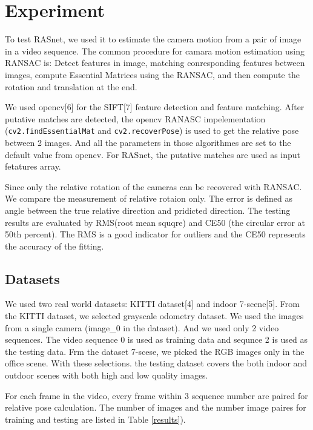 \documentclass{article}
\begin{document}
\section{Experiment}
To test RASnet, we used it to estimate the camera motion from a pair of image in a video sequence. The common procedure for camara motion estimation using RANSAC is: Detect features in image, matching conresponding features between images, compute Essential Matrices using the RANSAC, and then compute the rotation and translation at the end.

We used opencv[6] for the SIFT[7] feature detection and feature matching.  After putative matches are detected, the opencv RANASC impelementation  (\verb+cv2.findEssentialMat+ and \verb+cv2.recoverPose+) is used to get the relative pose between 2 images.
And all the parameters in those algorithmes are set to the default value from opencv. For RASnet, the putative matches are used as input fetatures array.

Since only the relative rotation of the cameras can be recovered with RANSAC. We compare the measurement of relative rotaion only. The error is defined as angle between the true relative direction and pridicted direction.
The testing results are evaluated by RMS(root mean squqre) and CE50 (the circular error at 50th percent). The RMS is a good indicator for outliers and the CE50 represents the accuracy of the fitting.


\subsection{Datasets}
We used two real world datasets: KITTI dataset[4] and indoor 7-scene[5].
From the KITTI dataset, we selected grayscale odometry dataset. We used the images from a single camera (image\_0 in the dataset). And we used only 2 video sequences. The video sequence 0 is used as training data and sequnce 2 is used as the testing data.
Frm the dataset 7-scese, we picked the RGB images only in the office scene. With these selections. the testing dataset covers the both indoor and outdoor scenes with both high and low quality images.


For each frame in the video, every frame within 3 sequence number are paired for relative pose calculation. The number of images and 
the number image paires for training and testing are listed in Table \ref{results}).
\end{document}
